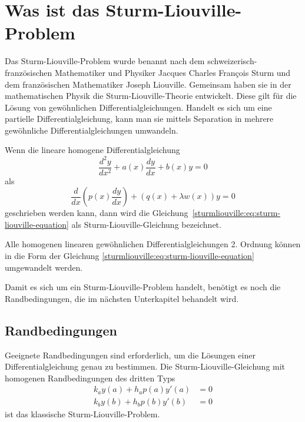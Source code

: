 %
%
%

\section{Was ist das Sturm-Liouville-Problem\label{sturmliouville:section:teil0}}
Das Sturm-Liouville-Problem wurde benannt nach dem schweizerisch-französischen
Mathematiker und Physiker Jacques Charles Fran\c{c}ois Sturm und dem
französischen Mathematiker Joseph Liouville.
Gemeinsam haben sie in der mathematischen Physik die Sturm-Liouville-Theorie
entwickelt.
Diese gilt für die Lösung von gewöhnlichen Differentialgleichungen.
Handelt es sich um eine partielle
Differentialgleichung, kann man sie mittels Separation in
mehrere gewöhnliche Differentialgleichungen umwandeln.

\begin{definition}
Wenn die lineare homogene Differentialgleichung
\[
	\frac{d^2y}{dx^2} + a(x)\frac{dy}{dx} + b(x)y = 0
\]
als
\begin{equation}
	\label{sturmliouville:eq:sturm-liouville-equation}
	\frac{d}{dx} (p(x) \frac{dy}{dx}) + (q(x) +
	\lambda w(x)) y
	=
	0 
\end{equation}
geschrieben werden kann, dann wird die
Gleichung~\eqref{sturmliouville:eq:sturm-liouville-equation} als 
Sturm-Liouville-Gleichung bezeichnet.
\end{definition}
Alle homogenen linearen gewöhnlichen Differentialgleichungen 2. Ordnung können
in die Form der Gleichung \eqref{sturmliouville:eq:sturm-liouville-equation} 
umgewandelt werden.

Damit es sich um ein Sturm-Liouville-Problem handelt, benötigt es noch die
Randbedingungen, die im nächsten Unterkapitel behandelt wird.

\subsection{Randbedingungen
\label{sturmliouville:sub:was-ist-das-slp-randbedingungen}}
Geeignete Randbedingungen sind erforderlich, um die Lösungen einer
Differentialgleichung genau zu bestimmen.
Die Sturm-Liouville-Gleichung mit homogenen Randbedingungen des dritten Typs
\begin{equation}
	\begin{aligned}
		\label{sturmliouville:eq:randbedingungen}
		k_a y(a) + h_a p(a) y'(a) &= 0 \\
		k_b y(b) + h_b p(b) y'(b) &= 0
	\end{aligned}
\end{equation}
ist das klassische Sturm-Liouville-Problem.


